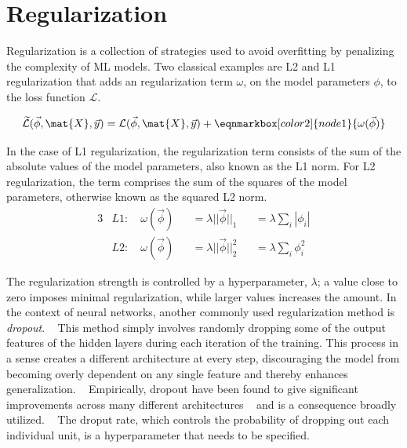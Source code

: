 \section{Regularization}
\label{sec:regularization}

Regularization is a collection of strategies used to avoid
overfitting by penalizing the complexity of \ac{ML} models.
Two classical examples are L2 and L1 regularization
that adds an regularization term \(\omega\),
on the model parameters \(\phi\),
to the loss function \(\mathcal{L}\).
~\autocite{goodfellow2016deep}

\vspace{1.5em}
\begin{equation}
    \widetilde{\mathcal{L}} (\vec{\phi} , \mat{X}, \vec{y}) =
    \mathcal{L} (\vec{\phi} , \mat{X}, \vec{y}) +
    \eqnmarkbox[color2]{node1}{ \omega (\vec{\phi})}
\end{equation}

In the case of L1 regularization, 
the regularization term consists of 
the sum of the absolute values of the model parameters, 
also known as the L1 norm. 
For L2 regularization, 
the term comprises the sum of the squares of the model parameters, 
otherwise known as the squared L2 norm.
~\autocite{murphyMachine2012}
%
\begin{alignat}{3}
    &L1: \quad \omega (\vec{\phi}) 
        &&= \lambda||\vec{\phi}||_1 
        &&= \lambda\sum_{i}|\phi_i|  \\
    &L2: \quad \omega (\vec{\phi}) 
        &&= \lambda||\vec{\phi}||_2^2 
        &&= \lambda\sum_{i} \phi_i^2
\end{alignat}

The regularization strength is controlled by a hyperparameter, \(\lambda\);
a value close to zero imposes minimal regularization, 
while larger values increases the amount.
In the context of neural networks, 
another commonly used regularization method is \textit{dropout}.
~\autocite{srivastava2014dropout}
This method simply involves randomly dropping some of the output features
of the hidden layers during each iteration of the training.
This process in a sense creates a different architecture at every step,
discouraging the model from becoming overly dependent on any single feature 
and thereby enhances generalization. 
~\autocite{charniakIntroduction2019}
Empirically, dropout have been found to give significant improvements across
many different architectures 
~\autocite{srivastava2014dropout}
and is a consequence broadly utilized.
~\autocite{charniakIntroduction2019}
The droput rate, which controls the probability of dropping out each
individual unit, is a hyperparameter that needs to be specified.

